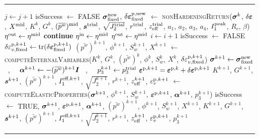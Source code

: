 \documentclass[11pt,a4paper]{article}
\makeatletter
\newenvironment{breakablealgorithm}
  {%
   \begin{center}
     \refstepcounter{algorithm}%
     \vspace{10pt}
     \hrule height.8pt depth0pt \kern2pt%
     \renewcommand{\caption}[2][\relax]{%
       {\raggedright\textbf{\ALG@name~\thealgorithm} ##2\par}%
       \ifx\relax##1\relax %
         \addcontentsline{loa}{algorithm}{\protect\numberline{\thealgorithm}##2}%
       \else %
         \addcontentsline{loa}{algorithm}{\protect\numberline{\thealgorithm}##1}%
       \fi
       \kern2pt\hrule\kern2pt
     }
  }{%
     \kern2pt\hrule\relax%
   \end{center}
  }
\makeatother
\begin{document}
\begin{breakablealgorithm}
\begin{algorithmic}[1]
            \State $j \leftarrow j+1$
             \State \Return isSuccess $\leftarrow$ FALSE
            \EndIf
          \EndIf
        \EndWhile
        \State $\boldsymbol{\sigma}_{\text{fixed}}^{\text{new}}$, $\delta\boldsymbol{\varepsilon}^{\text{p},\text{new}}_{\text{fixed}}$ $\leftarrow$
          \textsc{nonHardeningReturn}($\boldsymbol{\sigma}^k$, $\delta\boldsymbol{\varepsilon}$, $X^{\text{mid}}$, $K^k$, $G^k$, 
             $(\bar{p^w})^\Tmid$, \WRP
             $\boldsymbol{s}^{\text{trial}}$, $\sqrt{J_2^{\text{trial}}}$, $r^{\text{trial}}$, $z_{\text{eff}}^{\text{trial}}$, 
             $a_1$, $a_2$, $a_3$, $a_4$, $I_1^{\text{peak}}$, $R_c$, $\beta$) \WRP 
          \State $\eta^{\text{out}} \leftarrow \eta^{\text{mid}}$ 
          \State \textbf{continue}
        \EndIf
        \If {$\Norm{\delta\Bveps^{\Tp,\Tnew}_\Tfix}{} > \eta^\Tmid \Norm{\delta\Bveps^{\Tp}_\Tfix}{}$}
          \State $\eta^{\text{in}} \leftarrow \eta^{\text{mid}}$ 
        \Else
          \State $\eta^{\text{out}} \leftarrow \eta^{\text{mid}}$ 
        \EndIf
        \State $i \leftarrow i+1$
          \State \Return isSuccess $\leftarrow$ FALSE
        \EndIf
      \EndWhile 
      \State $\delta\varepsilon^{\text{p},k+1}_{v,\text{fixed}} \leftarrow \text{tr}(\delta\boldsymbol{\varepsilon}^{\text{p},k+1}_{\text{fixed}})$
      \State $(\bar{p^w})^{k+1}$, $\phi^{k+1}$, $S_w^{k+1}$, $X^{k+1}$ $\leftarrow$
        \textsc{computeInternalVariables}($K^k$, $G^k$, $(\bar{p^w})^k$, $\phi^k$, $S_w^k$,\WRP 
          $X^k$, $\delta\varepsilon^{\text{p},{k+1}}_{v,\text{fixed}}$)
      \State $\boldsymbol{\sigma}^{k+1} \leftarrow \boldsymbol{\sigma}^{\text{new}}_{\text{fixed}}$~,~~
             $\Balpha^{k+1} \leftarrow -(\bar{p^w})^{k+1} \BI$ ~,~~ $p_3^{k+1} \leftarrow p_3^{\text{trial}}$
      \State $\boldsymbol{\varepsilon}^{\text{p},{k+1}} = \boldsymbol{\varepsilon}^{\text{p},k} + \delta\boldsymbol{\varepsilon}^{\text{p},{k+1}}$
      \State $K^{k+1}$, $G^{k+1}$, $\boldsymbol{s}^{k+1}$, $(\bar{p^w})^{k+1}$, $I_1^{\text{eff},{k+1}}$, 
             $\sqrt{J_2^{k+1}}$, $r^{k+1}$, $z_{\text{eff}}^{k+1}$, $\varepsilon_v^{\text{p},{k+1}}$ $\leftarrow$ \WRP
          \textsc{computeElasticProperties}($\boldsymbol{\sigma}^{k+1}$, 
             $\phi^{k+1}$, $S_w^{k+1}$, $\boldsymbol{\varepsilon}^{\text{p},{k+1}}$, $\boldsymbol{\alpha}^{k+1}$, $p_3^{k+1}$) \WRP
      \State \Return isSuccess $\leftarrow$ TRUE, $\boldsymbol{\sigma}^{k+1}$, $\boldsymbol{\varepsilon}^{\text{p},{k+1}}$, $\boldsymbol{\alpha}^{k+1}$,
        $(\bar{p^w})^{k+1}$, $\phi^{k+1}$, $S_w^{k+1}$, $X^{k+1}$, $K^{k+1}$, $G^{k+1}$, \WRP
        $\boldsymbol{s}^{k+1}$, $(\bar{p^w})^{k+1}$, $I_1^{\text{eff},{k+1}}$, $\sqrt{J_2^{k+1}}$, $r^{k+1}$, 
        $z_{\text{eff}}^{k+1}$, $\varepsilon_v^{\text{p},{k+1}}$, $p_3^{k+1}$
    \EndProcedure
  \end{algorithmic}
\end{breakablealgorithm}
\end{document}

